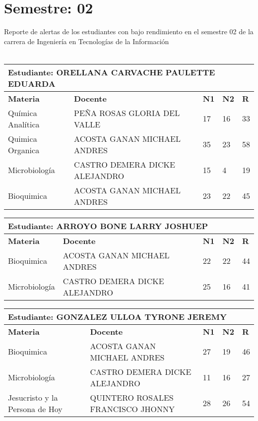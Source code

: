\section{Semestre: 02}
        Reporte de alertas de los estudiantes con bajo rendimiento en el semestre 02 de la carrera de 
        Ingeniería en Tecnologías de la Información\\\\\small
\begin{tabularx}{\textwidth}{|p{5cm}|p{7cm}|X|X|X|}
\hline
\multicolumn{5}{|p{\dimexpr\textwidth-2\tabcolsep-2\arrayrulewidth}|}{\textbf{Estudiante: ORELLANA CARVACHE PAULETTE EDUARDA }}\\\hline
\textbf{Materia} & \textbf{Docente} & \textbf{N1} & \textbf{N2} & \textbf{R} \\ \hline
Química Analítica & PEÑA ROSAS GLORIA DEL VALLE  & 17 & 16& 33 \\ \hline
Quimica Organica & ACOSTA GANAN MICHAEL ANDRES  & 35 & 23& 58 \\ \hline
Microbiología & CASTRO DEMERA DICKE ALEJANDRO  & 15 & 4& 19 \\ \hline
Bioquimica & ACOSTA GANAN MICHAEL ANDRES  & 23 & 22& 45 \\ \hline
\end{tabularx}\vspace{10mm}
\small
\begin{tabularx}{\textwidth}{|p{5cm}|p{7cm}|X|X|X|}
\hline
\multicolumn{5}{|p{\dimexpr\textwidth-2\tabcolsep-2\arrayrulewidth}|}{\textbf{Estudiante: ARROYO BONE LARRY JOSHUEP }}\\\hline
\textbf{Materia} & \textbf{Docente} & \textbf{N1} & \textbf{N2} & \textbf{R} \\ \hline
Bioquimica & ACOSTA GANAN MICHAEL ANDRES  & 22 & 22& 44 \\ \hline
Microbiología & CASTRO DEMERA DICKE ALEJANDRO  & 25 & 16& 41 \\ \hline
\end{tabularx}\vspace{10mm}
\small
\begin{tabularx}{\textwidth}{|p{5cm}|p{7cm}|X|X|X|}
\hline
\multicolumn{5}{|p{\dimexpr\textwidth-2\tabcolsep-2\arrayrulewidth}|}{\textbf{Estudiante: GONZALEZ ULLOA TYRONE JEREMY }}\\\hline
\textbf{Materia} & \textbf{Docente} & \textbf{N1} & \textbf{N2} & \textbf{R} \\ \hline
Bioquimica & ACOSTA GANAN MICHAEL ANDRES  & 27 & 19& 46 \\ \hline
Microbiología & CASTRO DEMERA DICKE ALEJANDRO  & 11 & 16& 27 \\ \hline
Jesucristo y la Persona de Hoy & QUINTERO ROSALES FRANCISCO JHONNY  & 28 & 26& 54 \\ \hline
\end{tabularx}\vspace{10mm}
